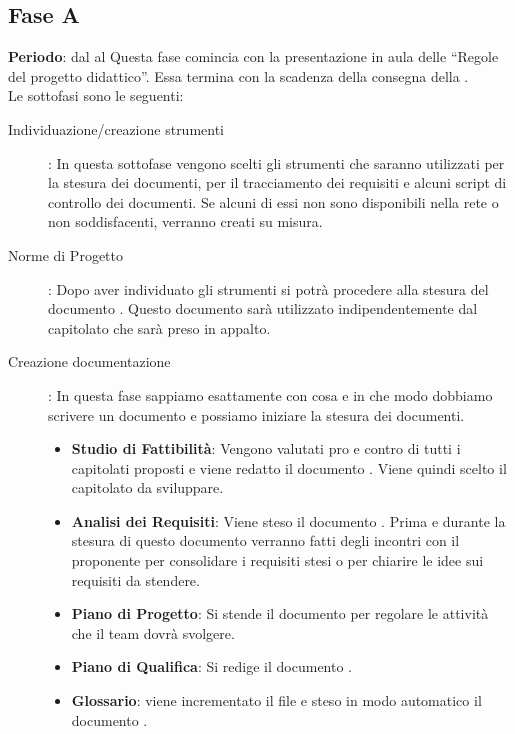 \subsection{Fase A}
	\textbf{Periodo}: dal  al 
	Questa fase comincia con la presentazione in aula delle “Regole del progetto didattico”. Essa termina con la scadenza della consegna della .\\Le sottofasi sono le seguenti:
	\begin{description}
		\item[Individuazione/creazione strumenti]: In questa sottofase vengono scelti gli strumenti che saranno utilizzati per la stesura dei documenti, per il tracciamento dei requisiti e alcuni script di controllo dei documenti. Se alcuni di essi non sono disponibili nella rete o non soddisfacenti, verranno creati su misura.
		\item[Norme di Progetto]: Dopo aver individuato gli strumenti si potrà procedere alla stesura del documento . Questo documento sarà utilizzato indipendentemente dal capitolato che sarà preso in appalto.
		\item[Creazione documentazione]: In questa fase sappiamo esattamente con cosa e in che modo dobbiamo scrivere un documento e possiamo iniziare la stesura dei documenti.
			\begin{itemize}
				\item \textbf{Studio di Fattibilità}: Vengono valutati pro e contro di tutti i capitolati proposti e viene redatto il documento . Viene quindi scelto il capitolato da sviluppare.
				\item \textbf{Analisi dei Requisiti}: Viene steso il documento . Prima e durante la stesura di questo documento verranno fatti degli incontri con il proponente per consolidare i requisiti stesi o per chiarire le idee sui requisiti da stendere.
				\item \textbf{Piano di Progetto}: Si stende il documento  per regolare le attività che il team dovrà svolgere.
				\item \textbf{Piano di Qualifica}: Si redige il documento .
				\item \textbf{Glossario}: viene incrementato il file   e steso in modo automatico il documento .
			\end{itemize}
	\end{description}
